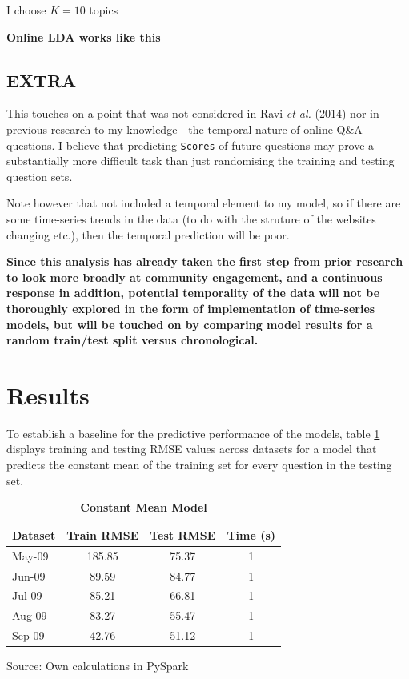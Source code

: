 \documentclass[11pt,preprint, authoryear]{article}
\numberwithin{equation}{section}
\begin{document}
I choose \(K=10\) topics

\textbf{Online LDA works like this}

\subsection{EXTRA}\label{extra}

This touches on a point that was not considered in Ravi \emph{et al.}
(2014) nor in previous research to my knowledge - the temporal nature of
online Q\&A questions. I believe that predicting \texttt{Scores} of
future questions may prove a substantially more difficult task than just
randomising the training and testing question sets.

Note however that not included a temporal element to my model, so if
there are some time-series trends in the data (to do with the struture
of the websites changing etc.), then the temporal prediction will be
poor.

\textbf{Since this analysis has already taken the first step from prior
research to look more broadly at community engagement, and a continuous
response in addition, potential temporality of the data will not be
thoroughly explored in the form of implementation of time-series models,
but will be touched on by comparing model results for a random
train/test split versus chronological.}

\newpage

\section{\texorpdfstring{Results
\label{Results}}{Results }}\label{results}

To establish a baseline for the predictive performance of the models,
table \ref{tab:rand_mean_model} displays training and testing RMSE
values across datasets for a model that predicts the constant mean of
the training set for every question in the testing set.

\footnotesize

\begin{longtable}[htbp] {@{} lccc @{}} 
\caption{\textbf{Constant Mean Model}} 
\label{tab:rand_mean_model} \\
\toprule
\textbf{Dataset} &  \textbf{Train RMSE} &  \textbf{Test RMSE} &  \textbf{Time (s)} \\
\midrule
May-09 &                185.85 &              75.37 &                 1  \\
Jun-09 &                 89.59 &              84.77 &                 1  \\
Jul-09 &                 85.21 &              66.81 &                 1  \\
Aug-09 &                 83.27 &              55.47 &                 1  \\
Sep-09 &                 42.76 &              51.12 &                 1  \\
\bottomrule
\end{longtable}\begin{center} Source: Own calculations in PySpark\end{center}
\end{document}
